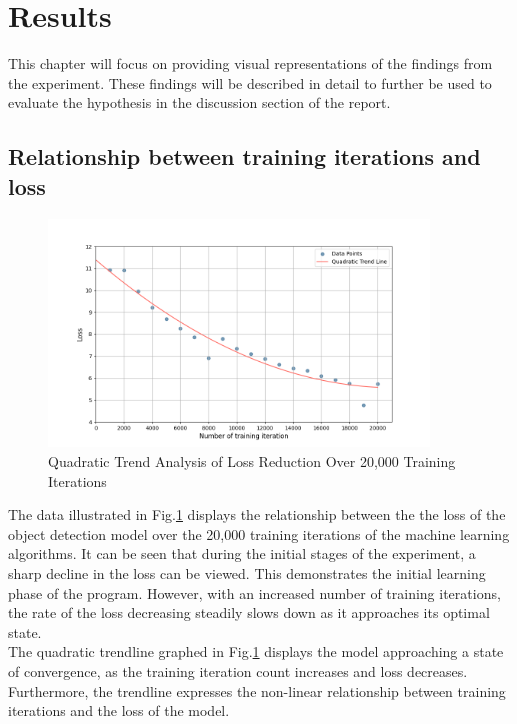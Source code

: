 \section{Results}
This chapter will focus on providing visual representations of the findings from the experiment. These findings will be described in detail to further be used to evaluate the hypothesis in the discussion section of the report. 


\subsection{Relationship between training iterations and loss}
\begin{figure}[h]
   \centering
   \includegraphics[width=0.9\textwidth]{../Data/loss_by_iteration_plot.png}
   \caption{Quadratic Trend Analysis of Loss Reduction Over 20,000 Training Iterations}
   \label{fig:loss-vs-training-iterations}
\end{figure}
The data illustrated in Fig.\ref{fig:loss-vs-training-iterations} displays the relationship between the the loss of the object detection model over the 20,000 training iterations of the machine learning algorithms. It can be seen that during the initial stages of the experiment, a sharp decline in the loss can be viewed. This demonstrates the initial learning phase of the program. However, with an increased number of training iterations, the rate of the loss decreasing steadily slows down as it approaches its optimal state. \\

The quadratic trendline graphed in Fig.\ref{fig:loss-vs-training-iterations}  displays the model approaching a state of convergence, as the training iteration count increases and loss decreases. Furthermore, the trendline expresses the non-linear relationship between training iterations and the loss of the model. \\
\newpage

